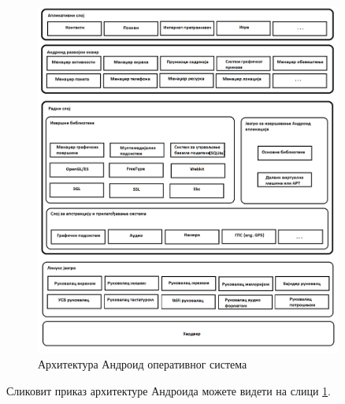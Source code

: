 \documentclass[12pt,oneside]{memoir}
\theoremstyle{remark}
\begin{document}
\begin{figure}[!ht]
\centering
\includegraphics[width=0.9\textwidth]{slike/arhitektiraandroida.png}
\caption{Архитектура Андроид оперативног система}
\label{fig:arhitektura}
\end{figure}
Сликовит приказ архитектуре Андроида можете видети на слици \ref{fig:arhitektura}.
\end{document}
